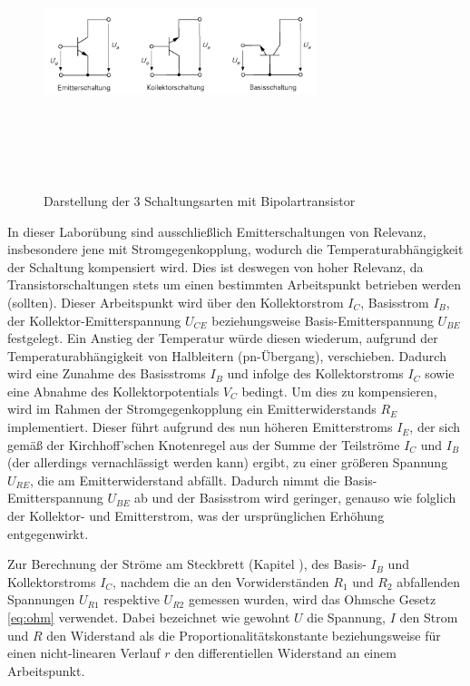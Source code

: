 \documentclass[12pt,english,ngerman]{scrartcl}
\begin{document}
\begin{figure}[H]
    \centering
    \includegraphics[width=8cm, height=8cm,keepaspectratio]{./figures/schaltungsarten.png}
    \caption{Darstellung der 3 Schaltungsarten mit Bipolartransistor \cite{tietze}}
    \label{fig:schaltungsarten}
\end{figure}

In dieser Laborübung sind ausschließlich Emitterschaltungen von Relevanz,
insbesondere jene mit Stromgegenkopplung, wodurch die Temperaturabhängigkeit
der Schaltung kompensiert wird. Dies ist deswegen von hoher Relevanz, da
Transistorschaltungen stets um einen bestimmten Arbeitspunkt betrieben werden
(sollten). Dieser Arbeitspunkt wird über den Kollektorstrom $I_C$, Basisstrom
$I_B$, der Kollektor-Emitterspannung $U_{CE}$ beziehungsweise
Basis-Emitterspannung $U_{BE}$ festgelegt. Ein Anstieg der Temperatur würde
diesen wiederum, aufgrund der Temperaturabhängigkeit von Halbleitern
(pn-Übergang), verschieben. Dadurch wird eine Zunahme des Basisstroms $I_B$ und
infolge des Kollektorstroms $I_C$ sowie eine Abnahme des Kollektorpotentials
$V_C$ bedingt. Um dies zu kompensieren, wird im Rahmen der Stromgegenkopplung
ein Emitterwiderstands $R_E$ implementiert. Dieser führt aufgrund des nun
höheren Emitterstroms $I_E$, der sich gemäß der Kirchhoff'schen Knotenregel aus
der Summe der Teilströme $I_C$ und $I_B$ (der allerdings vernachlässigt werden
kann) ergibt, zu einer größeren Spannung $U_{RE}$, die am Emitterwiderstand
abfällt. Dadurch nimmt die Basis-Emitterspannung $U_{BE}$ ab und der Basisstrom
wird geringer, genauso wie folglich der Kollektor- und Emitterstrom, was der
ursprünglichen Erhöhung entgegenwirkt. \cite{tietze}
\newline

Zur Berechnung der Ströme am Steckbrett (Kapitel ), des
Basis- $I_B$ und Kollektorstroms $I_C$, nachdem die an den Vorwiderständen
$R_1$ und $R_2$ abfallenden Spannungen $U_{R1}$ respektive $U_{R2}$ gemessen
wurden, wird das Ohmsche Gesetz \autoref{eq:ohm} verwendet. Dabei bezeichnet
wie gewohnt $U$ die Spannung, $I$ den Strom und $R$ den Widerstand als die
Proportionalitätskonstante beziehungsweise für einen nicht-linearen Verlauf $r$
den differentiellen Widerstand an einem Arbeitspunkt. \cite{tietze}
\end{document}
